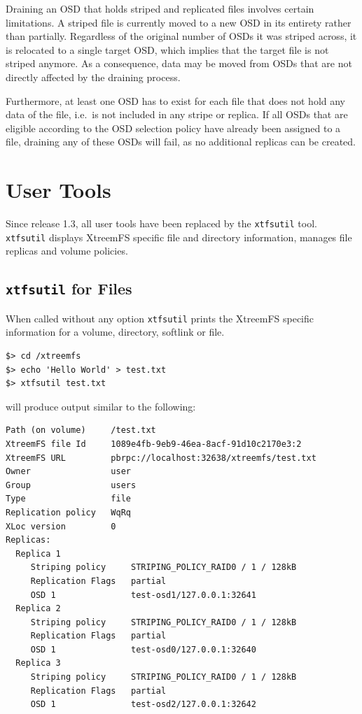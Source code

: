 \documentclass[a4paper,10pt]{book}
\begin{document}
Draining an OSD that holds striped and replicated files involves certain limitations. A striped file is currently moved to a new OSD in its entirety rather than partially. Regardless of the original number of OSDs it was striped across, it is relocated to a single target OSD, which implies that the target file is not striped anymore. As a consequence, data may be moved from OSDs that are not directly affected by the draining process.

Furthermore, at least one OSD has to exist for each file that does not hold any data of the file, i.e.\ is not included in any stripe or replica. If all OSDs that are eligible according to the OSD selection policy have already been assigned to a file, draining any of these OSDs will fail, as no additional replicas can be created.

\section{User Tools}

Since release 1.3, all user tools have been replaced by the \texttt{xtfsutil} tool. \texttt{xtfsutil} displays XtreemFS specific file and directory information, manages file replicas and volume policies.

\subsection{\texttt{xtfsutil} for Files}
\label{sec:xtfsutil_files}

When called without any option \texttt{xtfsutil} prints the XtreemFS specific information for a volume, directory, softlink or file.

\begin{verbatim}
$> cd /xtreemfs
$> echo 'Hello World' > test.txt
$> xtfsutil test.txt
\end{verbatim}


will produce output similar to the following:

\begin{verbatim}
Path (on volume)     /test.txt
XtreemFS file Id     1089e4fb-9eb9-46ea-8acf-91d10c2170e3:2
XtreemFS URL         pbrpc://localhost:32638/xtreemfs/test.txt
Owner                user
Group                users
Type                 file
Replication policy   WqRq
XLoc version         0
Replicas:
  Replica 1
     Striping policy     STRIPING_POLICY_RAID0 / 1 / 128kB
     Replication Flags   partial
     OSD 1               test-osd1/127.0.0.1:32641
  Replica 2
     Striping policy     STRIPING_POLICY_RAID0 / 1 / 128kB
     Replication Flags   partial
     OSD 1               test-osd0/127.0.0.1:32640
  Replica 3
     Striping policy     STRIPING_POLICY_RAID0 / 1 / 128kB
     Replication Flags   partial
     OSD 1               test-osd2/127.0.0.1:32642
\end{verbatim}
\end{document}
